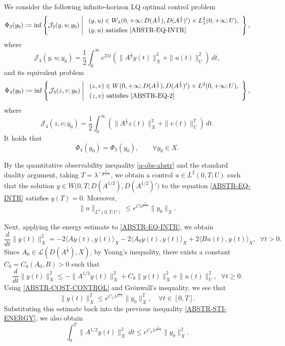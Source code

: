 \documentclass[a4paper]{article}
\numberwithin{equation}{section}
\begin{document}
We consider the following infinite-horizon LQ optimal control problem
\begin{equation}\label{COFUC-NEW-11}
\Phi_3(y_0):= {\inf}\left\{\mathcal J_3(y,u;y_0)\;\middle|\;
\begin{array}{l}
(y,u)\in W_{\lambda}(0,+\infty;D(A^{\frac{1}{2}}),D(A^{\frac{1}{2}})')\times L^2_{\lambda}(0,+\infty;U),\\[1mm]
(y,u)\ \text{satisfies \eqref{ABSTR-EQ-INTR}}
\end{array}\right\},
\end{equation}
where
\begin{equation}\label{CO-FUNCAL-11}
\mathcal J_3(y,u;y_0)=\frac12\int_0^\infty e^{2\lambda t}\left(\|A^{\frac 12}y(t)\|_{X}^2+
\|u(t)\|_{U}^2\right)\,dt,
\end{equation}
and its equivalent problem
\begin{equation}\label{COFUC-NEW-111}
\Phi_4(y_0):= {\inf}\left\{\mathcal J_4(z,v;y_0)\;\middle|\;
\begin{array}{l}
(z,v)\in W(0,+\infty;D(A^{\frac 12}),D(A^{\frac{1}{2}})')\times L^2(0,+\infty;U),\\[1mm]
(z,v)\ \text{satisfies \eqref{ABSTR-EQ-2}}
\end{array}\right\},
\end{equation}
where
\begin{equation}\label{CO-FUNCAL-111}
\mathcal J_4(z,v;y_0)=\frac12\int_0^\infty\left(\|A^{\frac 12}z(t)\|_{X}^2+\|v(t)\|_{U}^2\right)\,dt.
\end{equation}
It holds that
$$\Phi_4(y_0)=\Phi_3(y_0), \qquad \forall y_0\in X.$$

By the quantitative observability inequality \eqref{q-obs-abstr} and the standard duality argument, taking $T=\lambda^{-\frac1{p+1}}$, we obtain a control $u\in L^2(0,T;U)$ such that the solution $y\in W\big(0,T;D(A^{1/2}),D(A^{1/2})'\big)$ to the equation \eqref{ABSTR-EQ-INTR} satisfies $y(T)=0$. Moreover,
\begin{equation}\label{ABSTR-COST-CONTROL}
\|u\|_{L^2(0,T;U)}\le e^{C\lambda^{\frac{p}{p+1}}}\|y_0\|_X.
\end{equation}

Next, applying the energy estimate to \eqref{ABSTR-EQ-INTR}, we obtain
$$\frac{d}{dt}\|y(t)\|_X^2=-2\langle Ay(t),y(t)\rangle_X-2\langle A_0y(t),y(t)\rangle_X+2\langle Bu(t),y(t)\rangle_X,\;\;\forall t> 0.$$
Since $A_0\in \mathcal L(D(A^{\frac 12}),X)$, by Young's inequality, there exists a constant $C_0=C_0(A_0,B)>0$ such that
\begin{equation}\label{ABSTR-STI-ENERGY}
\frac{d}{dt}\|y(t)\|_X^2\le-\|A^{1/2}y(t)\|_X^2+C_0\|y(t)\|_X^2
+\|u(t)\|_U^2,\;\;\forall t\ge 0.
\end{equation}
Using \eqref{ABSTR-COST-CONTROL} and Gr\"onwall's inequality, we see that
$$\|y(t)\|_X^2\le e^{C_1\lambda^{\frac{p}{p+1}}}\|y_0\|_X^2,\quad \forall t\in[0,T].$$
Substituting this estimate back into the previous inequality \eqref{ABSTR-STI-ENERGY}, we also obtain
\begin{equation}\label{AA1/2-EST}\int_0^T\|A^{1/2}y(t)\|_X^2\,dt\le e^{C_2\lambda^{\frac{p}{p+1}}}\|y_0\|_X^2.
\end{equation}
\end{document}
